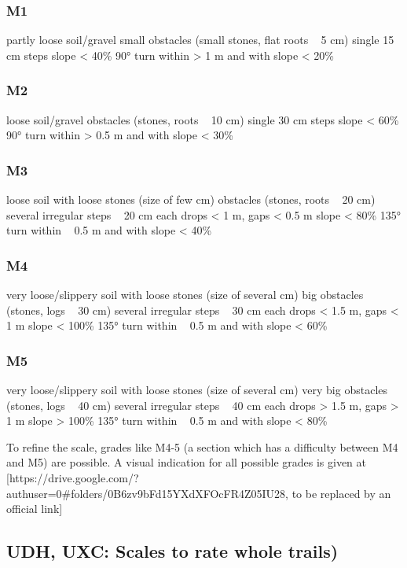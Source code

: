 \subsubsection{M1}
partly loose soil/gravel
small obstacles (small stones, flat roots ~ 5 cm)
single 15 cm steps
slope < 40\%
90° turn within > 1 m and with slope < 20\%

\subsubsection{M2}
loose soil/gravel
obstacles (stones, roots ~ 10 cm)
single 30 cm steps
slope < 60\%
90° turn within > 0.5 m and with slope < 30\%

\subsubsection{M3}
loose soil with loose stones (size of few cm)
obstacles (stones, roots ~ 20 cm)
several irregular steps ~ 20 cm each
drops < 1 m, gaps < 0.5 m
slope < 80\%
135° turn within ~ 0.5 m and with slope < 40\%

\subsubsection{M4}
very loose/slippery soil with loose stones (size of several cm)
big obstacles (stones, logs ~ 30 cm)
several irregular steps ~ 30 cm each
drops < 1.5 m, gaps < 1 m
slope < 100\%
135° turn within ~ 0.5 m and with slope < 60\%

\subsubsection{M5}
very loose/slippery soil with loose stones (size of several cm)
very big obstacles (stones, logs ~ 40 cm)
several irregular steps ~ 40 cm each
drops > 1.5 m, gaps > 1 m
slope > 100\%
135° turn within ~ 0.5 m and with slope < 80\%

To refine the scale, grades like M4-5 (a section which has a difficulty between
M4 and M5) are possible. A visual indication for all possible grades is given at
[https://drive.google.com/?authuser=0#folders/0B6zv9bFd15YXdXFOcFR4Z05IU28, to
be replaced by an official link]

\subsection{UDH, UXC: Scales to rate whole trails)}

